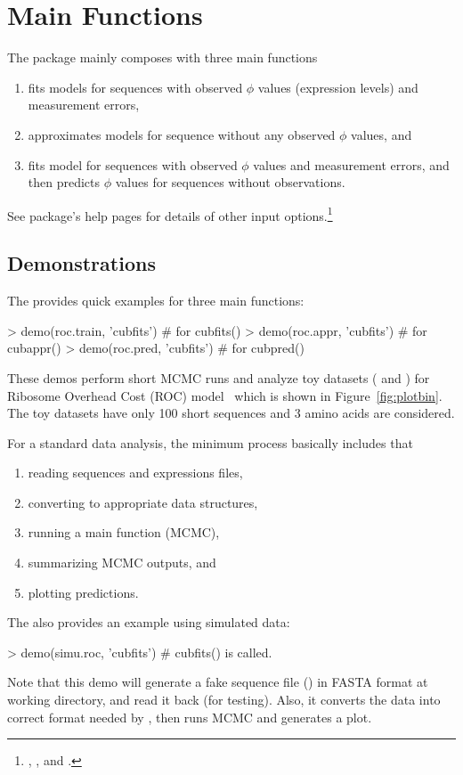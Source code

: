 
\section[Main Functions]{Main Functions}
\label{sec:main_functions}

The  package mainly composes with three main functions
\begin{enumerate}
\item {} fits models for sequences with observed $\phi$ values
      (expression levels) and measurement errors,
\item {} approximates models for sequence without any observed
      $\phi$ values, and
\item {} fits model for sequences with observed $\phi$ values
      and measurement errors, and then predicts $\phi$ values for sequences
      without observations.
\end{enumerate}
See package's help pages for details of other input options.\footnote{
, , and
.
}


\subsection[Demonstrations]{Demonstrations}
\label{sec:demonstrtions}

The  provides quick examples for three main functions:
\begin{Code}
> demo(roc.train, 'cubfits')    # for cubfits()
> demo(roc.appr, 'cubfits')     # for cubappr()
> demo(roc.pred, 'cubfits')     # for cubpred()
\end{Code}
These  demos perform short MCMC runs
and analyze toy datasets ( and ) for
Ribosome Overhead Cost (ROC) model~\citep{Shah2011}
which is shown in Figure~\ref{fig:plotbin}. The toy datasets have only 100
short sequences and 3 amino acids are considered.

For a standard data analysis, the minimum process basically includes that
\begin{enumerate}
\item reading sequences and expressions files,
\item converting to appropriate data structures,
\item running a main function (MCMC),
\item summarizing MCMC outputs, and
\item plotting predictions.
\end{enumerate}
The  also provides an example using simulated data:
\begin{Code}
> demo(simu.roc, 'cubfits')     # cubfits() is called.
\end{Code}
Note that this demo will generate a fake sequence file ()
in FASTA format at working directory, and
read it back (for testing). Also, it converts the data into correct format
needed by , then runs MCMC and generates a plot.


